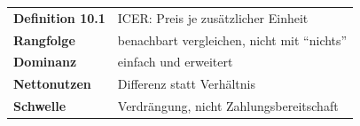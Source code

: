 \begin{merksatz}
\begin{center}
\renewcommand{\arraystretch}{1.5}
\begin{tabular}{@{}P{3.0cm}P{5.6cm}@{}}
\toprule
\textbf{Definition 10.1} & ICER: Preis je zusätzlicher Einheit\\
\textbf{Rangfolge} & benachbart vergleichen, nicht mit \enquote{nichts}\\
\textbf{Dominanz} & einfach und erweitert\\
\textbf{Nettonutzen} & Differenz statt Verhältnis\\
\textbf{Schwelle} & Verdrängung, nicht Zahlungsbereitschaft\\
\bottomrule
\end{tabular}
\end{center}

\begin{center}
\begin{minipage}{0.88\textwidth}
\end{minipage}
\end{center}
\end{merksatz}
